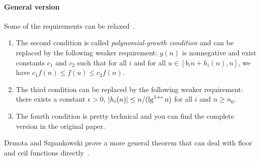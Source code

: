 \paragraph{General version}
Some of the requirements can be relaxed~\cite{Leighton1996}.
\begin{enumerate}
\item The second condition is called {\em polynomial-growth condition} and can be replaced by the following weaker requirement: $g(n)$ is nonnegative and exist constants $c_1$ and $c_2$ such that for all $i$ and for all $u \in [b_in + h_i(n), n]$, we have $c_1f(n) \leq f(u) \leq c_2 f(n)$.
\item The third condition can be replaced by the following weaker requirement: there exists a constant $\epsilon > 0$, $\lvert h_i(n)\rvert \leq n / (\lg^{1 + \epsilon} n)$ for all $i$ and $n \geq n_0$.
\item The fourth condition is pretty technical and you can find the complete version in the original paper.
\end{enumerate}
Drmota and Szpankowski prove a more general theorem that can deal with floor and ceil functions directly~\cite{Drmota2013}.


